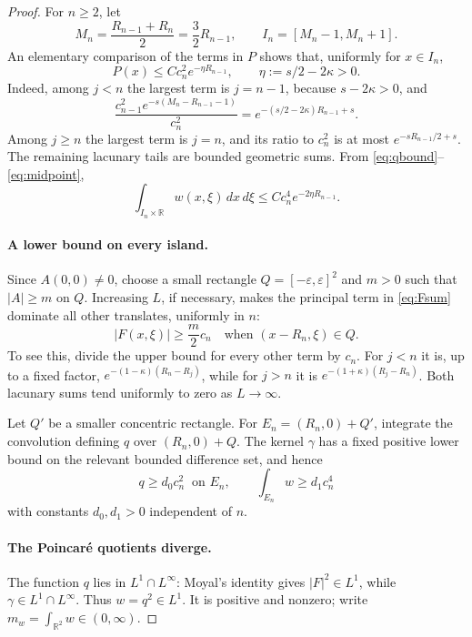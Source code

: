 \documentclass[11pt]{article}
\newcommand{\R}{\mathbb R}
\begin{document}
\begin{proof}
For \(n\ge2\), let
\[
 M_n=\frac{R_{n-1}+R_n}{2}=\frac32R_{n-1},\qquad
 I_n=[M_n-1,M_n+1].
\]
An elementary comparison of the terms in \(P\) shows that, uniformly for
\(x\in I_n\),
\begin{equation}\label{eq:midpoint}
 P(x)\le Cc_n^2e^{-\eta R_{n-1}},\qquad
 \eta:=s/2-2\kappa>0.
\end{equation}
Indeed, among \(j<n\) the largest term is \(j=n-1\), because
\(s-2\kappa>0\), and
\[
 \frac{c_{n-1}^2e^{-s(M_n-R_{n-1}-1)}}{c_n^2}
 =e^{-(s/2-2\kappa)R_{n-1}+s}.
\]
Among \(j\ge n\) the largest term is \(j=n\), and its ratio to \(c_n^2\)
is at most \(e^{-sR_{n-1}/2+s}\).  The remaining lacunary tails are bounded
geometric sums.  From \eqref{eq:qbound}--\eqref{eq:midpoint},
\begin{equation}\label{eq:gapmass}
 \int_{I_n\times\R}w(x,\xi)\,dx\,d\xi
 \le Cc_n^4e^{-2\eta R_{n-1}}.
\end{equation}

\paragraph{A lower bound on every island.}
Since \(A(0,0)\ne0\), choose a small rectangle
\(Q=[-\varepsilon,\varepsilon]^2\) and \(m>0\) such that
\(|A|\ge m\) on \(Q\).  Increasing \(L\), if necessary, makes the principal
term in \eqref{eq:Fsum} dominate all other translates, uniformly in \(n\):
\[
 |F(x,\xi)|\ge \frac m2c_n
 \quad\text{when }(x-R_n,\xi)\in Q.
\]
To see this, divide the upper bound for every other term by \(c_n\).  For
\(j<n\) it is, up to a fixed factor,
\(e^{-(1-\kappa)(R_n-R_j)}\), while for \(j>n\) it is
\(e^{-(1+\kappa)(R_j-R_n)}\).  Both lacunary sums tend uniformly to zero as
\(L\to\infty\).

Let \(Q'\) be a smaller concentric rectangle.  For
\(E_n=(R_n,0)+Q'\), integrate the convolution defining \(q\) over
\((R_n,0)+Q\).  The kernel \(\gamma\) has a fixed positive lower bound on the
relevant bounded difference set, and hence
\begin{equation}\label{eq:islandmass}
 q\ge d_0c_n^2\ \text{ on }E_n,\qquad
 \int_{E_n}w\ge d_1c_n^4
\end{equation}
with constants \(d_0,d_1>0\) independent of \(n\).

\paragraph{The Poincar\'e quotients diverge.}
The function \(q\) lies in \(L^1\cap L^\infty\): Moyal's identity gives
\(|F|^2\in L^1\), while \(\gamma\in L^1\cap L^\infty\).  Thus
\(w=q^2\in L^1\).  It is positive and nonzero; write
\(m_w=\int_{\R^2}w\in(0,\infty)\).


\end{proof}
\end{document}
